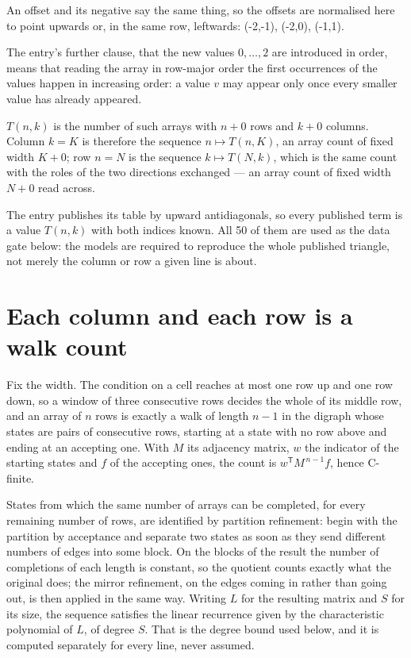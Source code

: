 \documentclass[11pt]{article}
\theoremstyle{definition}
\begin{document}
An offset and its negative say the same thing, so the offsets are normalised here to point upwards or, in the same row, leftwards: (-2,-1), (-2,0), (-1,1).

The entry's further clause, that the new values $0,\dots,2$ are introduced in order, means that reading the array in row-major order the first occurrences of the values happen in increasing order: a value $v$ may appear only once every smaller value has already appeared.

$T(n,k)$ is the number of such arrays with $n + 0$ rows and $k + 0$ columns. Column $k = K$ is therefore the sequence $n \mapsto T(n,K)$, an array count of fixed width $K + 0$; row $n = N$ is the sequence $k \mapsto T(N,k)$, which is the same count with the roles of the two directions exchanged --- an array count of fixed width $N + 0$ read across.

The entry publishes its table by upward antidiagonals, so every published term is a value $T(n,k)$ with both indices known. All 50 of them are used as the data gate below: the models are required to reproduce the whole published triangle, not merely the column or row a given line is about.

\section{Each column and each row is a walk count}

Fix the width. The condition on a cell reaches at most one row up and one row down, so a window of three consecutive rows decides the whole of its middle row, and an array of $n$ rows is exactly a walk of length $n-1$ in the digraph whose states are pairs of consecutive rows, starting at a state with no row above and ending at an accepting one. With $M$ its adjacency matrix, $w$ the indicator of the starting states and $f$ of the accepting ones, the count is $w^{\mathsf T}M^{\,n-1}f$, hence C-finite.

States from which the same number of arrays can be completed, for every remaining number of rows, are identified by partition refinement: begin with the partition by acceptance and separate two states as soon as they send different numbers of edges into some block. On the blocks of the result the number of completions of each length is constant, so the quotient counts exactly what the original does; the mirror refinement, on the edges coming in rather than going out, is then applied in the same way. Writing $L$ for the resulting matrix and $S$ for its size, the sequence satisfies the linear recurrence given by the characteristic polynomial of $L$, of degree $S$. That is the degree bound used below, and it is computed separately for every line, never assumed.
\end{document}
